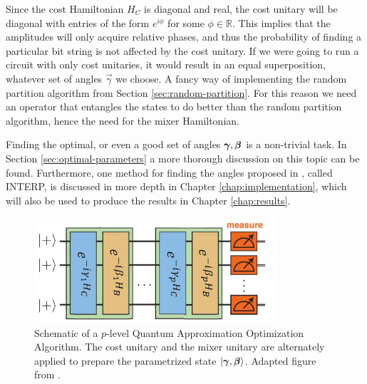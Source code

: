 Since the cost Hamiltonian $H_C$ is diagonal and real, the cost unitary will be diagonal with entries of the form $e^{i\phi}$ for some $\phi \in \mathbb{R}$. This implies that the amplitudes will only acquire relative phases, and thus the probability of finding a particular bit string is not affected by the cost unitary. If we were going to run a circuit with only cost unitaries, it would result in an equal superposition, whatever set of angles $\vec{\gamma}$ we choose. A fancy way of implementing the random partition algorithm from Section \ref{sec:random-partition}. For this reason we need an operator that entangles the states to do better than the random partition algorithm, hence the need for the mixer Hamiltonian.

Finding the optimal, or even a good set of angles $\bm{\gamma},\bm{\beta}$ is a non-trivial task. In Section \ref{sec:optimal-parameters} a more thorough discussion on this topic can be found. Furthermore, one method for finding the angles proposed in \cite{ZWCPL18}, called INTERP, is discussed in more depth in Chapter \ref{chap:implementation}, which will also be used to produce the results in Chapter \ref{chap:results}.

\begin{figure}[H]
	\centering
	\includegraphics[width=0.8\textwidth]{figures/qaoa_idea_edit.JPG}
	\caption{Schematic of a $p$-level Quantum Approximation Optimization Algorithm. The cost unitary and the mixer unitary are alternately applied to prepare the parametrized state $|\bm{\gamma},\bm{\beta}\rangle$. Adapted figure from \cite{ZWCPL18}.}
	\label{fig:schematic-qaoa}
\end{figure}


